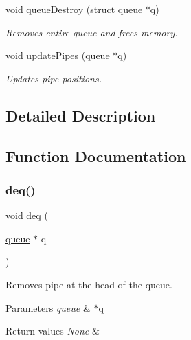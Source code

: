 \begin{DoxyCompactItemize}
void \hyperlink{group___queue___structure_gaf0183bb74c502f839f05ccb60e90496f}{queue\+Destroy} (struct \hyperlink{structqueue}{queue} $\ast$\hyperlink{structqueue}{q})
\begin{DoxyCompactList}\small\item\em Removes entire queue and frees memory. \end{DoxyCompactList}\item 
void \hyperlink{group___queue___structure_gaa67785a5fa2b77b9cb310adba3fd18af}{update\+Pipes} (\hyperlink{structqueue}{queue} $\ast$\hyperlink{structqueue}{q})
\begin{DoxyCompactList}\small\item\em Updates pipe positions. \end{DoxyCompactList}\end{DoxyCompactItemize}


\subsection{Detailed Description}


\subsection{Function Documentation}
\mbox{\label{group___queue___structure_ga096d562d71d667b63d6dfedb74cd2729}} 
\subsubsection{\texorpdfstring{deq()}{deq()}}
{\footnotesize\ttfamily void deq (\begin{DoxyParamCaption}\item[{\hyperlink{structqueue}{queue} $\ast$}]{q }\end{DoxyParamCaption})}



Removes pipe at the head of the queue. 


\begin{DoxyParams}{Parameters}
{\em queue} & $\ast$q \\
\hline
\end{DoxyParams}

\begin{DoxyRetVals}{Return values}
{\em None} & \\
\hline
\end{DoxyRetVals}
\mbox{\label{group___queue___structure_ga89512be15c27bb4def10b3e6dff1d240}} 
